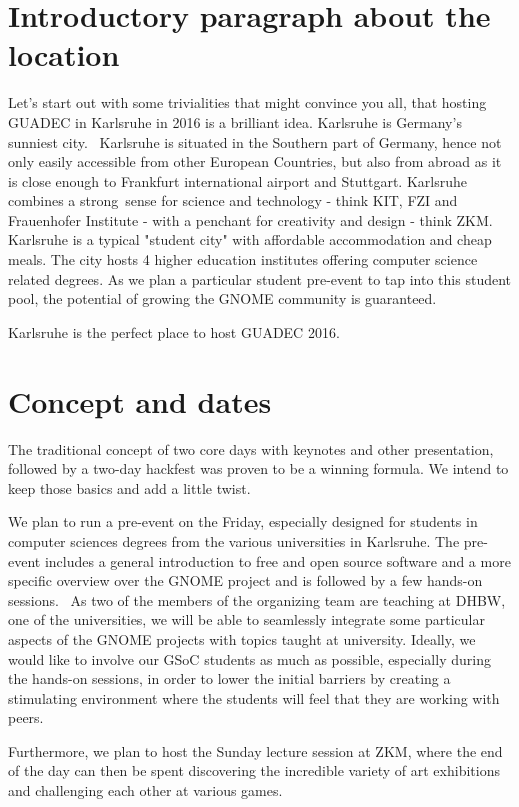 \section{Introductory paragraph about the location}

Let's start out with some trivialities that might convince you all, that hosting GUADEC in Karlsruhe in 2016 is a brilliant idea. Karlsruhe is Germany's sunniest city.  Karlsruhe is situated in the Southern part of Germany, hence not only easily accessible from other European Countries, but also from abroad as it is close enough to Frankfurt international airport and Stuttgart. Karlsruhe combines a strong sense for science and technology - think KIT, FZI and Frauenhofer Institute - with a penchant for creativity and design - think ZKM. Karlsruhe is a typical "student city" with affordable accommodation and cheap meals. The city hosts 4 higher education institutes offering computer science related degrees. As we plan a particular student pre-event to tap into this student pool, the potential of growing the GNOME community is guaranteed.  

Karlsruhe is the perfect place to host GUADEC 2016. 

\section{Concept and dates}

The traditional concept of two core days with keynotes and other presentation, followed by a two-day hackfest was proven to be a winning formula. We intend to keep those basics and add a little twist. 

We plan to run a pre-event on the Friday, especially designed for students in computer sciences degrees from the various universities in Karlsruhe. The pre-event includes a general introduction to free and open source software and a more specific overview over the GNOME project and is followed by a few hands-on sessions.  As two of the members of the organizing team are teaching at DHBW, one of the universities, we will be able to seamlessly integrate some particular aspects of the GNOME projects with topics taught at university. Ideally, we would like to involve our GSoC students as much as possible, especially during the hands-on sessions, in order to lower the initial barriers by creating a stimulating environment where the students will feel that they are working with peers. 

Furthermore, we plan to host the Sunday lecture session at ZKM, where the end of the day can then be spent discovering the incredible variety of art exhibitions and challenging each other at various games.

